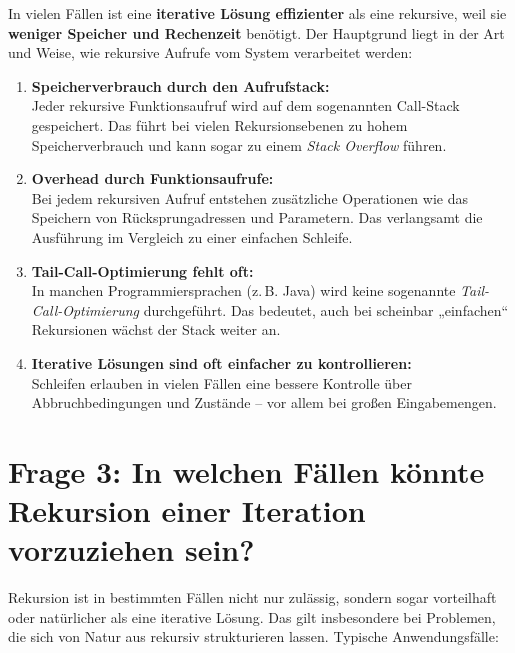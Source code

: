 \documentclass{article}
\begin{document}
	In vielen Fällen ist eine \textbf{iterative Lösung effizienter} als eine rekursive, weil sie \textbf{weniger Speicher und Rechenzeit} benötigt. Der Hauptgrund liegt in der Art und Weise, wie rekursive Aufrufe vom System verarbeitet werden:
	\begin{enumerate}
		\item \textbf{Speicherverbrauch durch den Aufrufstack:} \\
		Jeder rekursive Funktionsaufruf wird auf dem sogenannten Call-Stack gespeichert. Das führt bei vielen Rekursionsebenen zu hohem Speicherverbrauch und kann sogar zu einem \emph{Stack Overflow} führen.
		
		\item \textbf{Overhead durch Funktionsaufrufe:} \\
		Bei jedem rekursiven Aufruf entstehen zusätzliche Operationen wie das Speichern von Rücksprungadressen und Parametern. Das verlangsamt die Ausführung im Vergleich zu einer einfachen Schleife.
		
		\item \textbf{Tail-Call-Optimierung fehlt oft:} \\
		In manchen Programmiersprachen (z.\,B. Java) wird keine sogenannte \emph{Tail-Call-Optimierung} durchgeführt. Das bedeutet, auch bei scheinbar „einfachen“ Rekursionen wächst der Stack weiter an.
		
		\item \textbf{Iterative Lösungen sind oft einfacher zu kontrollieren:} \\
		Schleifen erlauben in vielen Fällen eine bessere Kontrolle über Abbruchbedingungen und Zustände – vor allem bei großen Eingabemengen.
	\end{enumerate}
	
	
	\section*{Frage 3: In welchen Fällen könnte Rekursion einer Iteration vorzuziehen sein?}
	
	Rekursion ist in bestimmten Fällen nicht nur zulässig, sondern sogar vorteilhaft oder natürlicher als eine iterative Lösung. Das gilt insbesondere bei Problemen, die sich von Natur aus rekursiv strukturieren lassen. Typische Anwendungsfälle:
	
\end{document}

